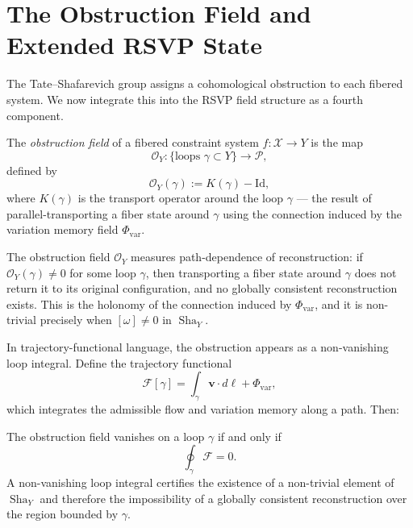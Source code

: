 \documentclass[11pt,openany]{book}
\newcommand{\Sha}{\operatorname{Sha}}
\begin{document}
\section{The Obstruction Field and Extended RSVP State}
\label{sec:obstruction-field}

The Tate--Shafarevich group assigns a cohomological
obstruction to each fibered system.  We now integrate this
into the RSVP field structure as a fourth component.

\begin{definition}
\label{def:obstruction-field}
The \emph{obstruction field} of a fibered constraint system
$f : \mathcal{X} \to Y$ is the map
\[
  \mathcal{O}_Y : \{\text{loops } \gamma \subset Y\}
    \to \mathcal{P},
\]
defined by
\[
  \mathcal{O}_Y(\gamma) := K(\gamma) - \mathrm{Id},
\]
where $K(\gamma)$ is the transport operator around the
loop $\gamma$ --- the result of parallel-transporting a
fiber state around $\gamma$ using the connection induced
by the variation memory field $\Phi_{\mathrm{var}}$.
\end{definition}

\begin{remark}
The obstruction field $\mathcal{O}_Y$ measures
path-dependence of reconstruction: if $\mathcal{O}_Y
(\gamma) \neq 0$ for some loop $\gamma$, then
transporting a fiber state around $\gamma$ does not return
it to its original configuration, and no globally
consistent reconstruction exists.  This is the holonomy
of the connection induced by $\Phi_{\mathrm{var}}$, and
it is non-trivial precisely when $[\omega] \neq 0$ in
$\Sha_Y$.
\end{remark}

In trajectory-functional language, the obstruction appears
as a non-vanishing loop integral.  Define the trajectory
functional
\[
  \mathcal{F}[\gamma] = \int_\gamma \boldsymbol{v} \cdot
    d\ell + \Phi_{\mathrm{var}},
\]
which integrates the admissible flow and variation memory
along a path.  Then:

\begin{proposition}
\label{prop:loop-integral}
The obstruction field vanishes on a loop $\gamma$ if and
only if
\[
  \oint_\gamma \mathcal{F} = 0.
\]
A non-vanishing loop integral certifies the existence of a
non-trivial element of $\Sha_Y$ and therefore the
impossibility of a globally consistent reconstruction over
the region bounded by $\gamma$.
\end{proposition}
\end{document}
